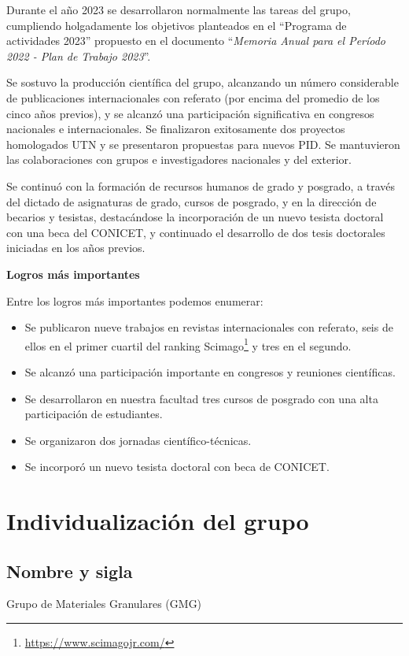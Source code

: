 \documentclass[a4paper,11pt,twoside,final,titlepage,onecolumn,openright]{report}
\begin{document}
Durante el año 2023 se desarrollaron normalmente las tareas del grupo, cumpliendo holgadamente los objetivos planteados en el ``Programa de actividades 2023'' propuesto en el documento ``\textit{Memoria Anual para el Período 2022 - Plan de Trabajo 2023}''. 

Se sostuvo la producción científica del grupo, alcanzando un número considerable de publicaciones internacionales con referato (por encima del promedio de los cinco años previos), y se alcanzó una participación significativa en congresos nacionales e internacionales. Se finalizaron exitosamente dos proyectos homologados UTN y se presentaron propuestas para nuevos PID. Se mantuvieron las colaboraciones con grupos e investigadores nacionales y del exterior.

Se continuó con la formación de recursos humanos de grado y posgrado, a través del dictado de asignaturas de grado, cursos de posgrado, y en la dirección de becarios y tesistas, destacándose la incorporación de un nuevo tesista doctoral con una beca del CONICET, y continuado el desarrollo de dos tesis doctorales iniciadas en los años previos.

\vspace{0.5cm}

{\bf Logros más importantes}

Entre los logros más importantes podemos enumerar:

\begin{itemize}
    \item Se publicaron nueve trabajos en revistas internacionales con referato, seis de ellos en el primer cuartil del ranking Scimago\footnote{\url{https://www.scimagojr.com/}} y tres en el segundo.
\item Se alcanzó una participación importante en congresos y reuniones científicas.
\item Se desarrollaron en nuestra facultad tres cursos de posgrado con una alta participación de estudiantes.
\item Se organizaron dos jornadas científico-técnicas.
\item Se incorporó un nuevo tesista doctoral con beca de CONICET.
\end{itemize}


\section{Individualización del grupo}

\subsection{Nombre y sigla}
 Grupo de Materiales Granulares (GMG)
\end{document}

